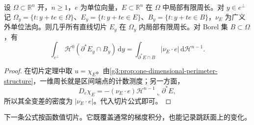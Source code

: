 \begin{corollary}\label{g3:cor:perimeter-line-slices}
	设 \(\Omega\subset\mathbb R^n\) 开，\(n\ge1\)，\(e\) 为单位向量，\(E\subset\mathbb R^n\) 在 \(\Omega\) 中局部有限周长。对 \(y\in e^\perp\) 记 \(\Omega_y=\{t:y+te\in\Omega\}\)、\(E_y=\{t:y+te\in E\}\)、\(B_y=\{t:y+te\in B\}\)，\(\nu_E\) 为广义外单位法向。则几乎所有直线切片 \(E_y\) 在 \(\Omega_y\) 内局部有限周长。对 Borel 集 \(B\subset\Omega\)，有
	\[
		\int_{e^\perp}\mathcal H^0(\partial^*E_y\cap B_y)\,\mathrm dy
		=\int_{\partial^*E\cap B}|\nu_E\cdot e|\,\mathrm d\mathcal H^{n-1}.
	\]
\end{corollary}
\begin{proof}
	在切片定理中取 \(u=\chi_E\)。由\cref{g3:prop:one-dimensional-perimeter-structure}，一维周长就是区间端点的计数测度；另一方面，
	\[
		D_e\chi_E=-(\nu_E\cdot e)\mathcal H^{n-1}\!\llcorner\partial^*E,
	\]
	所以其全变差的密度为 \(|\nu_E\cdot e|\)。代入切片公式即可。
\end{proof}

下一条公式按函数值切片。它既覆盖通常的梯度积分，也能记录跳跃面上的变化。

